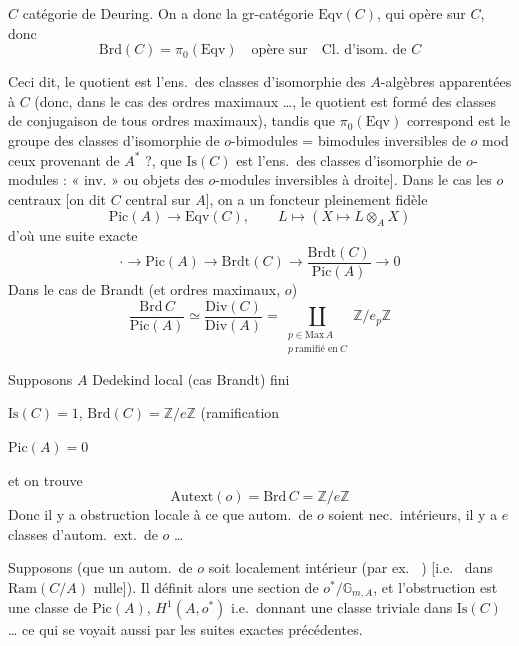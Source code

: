 \documentclass[11pt,a4paper]{article}
\begin{document}
$C$ catégorie de Deuring. On a donc la gr-catégorie $\mathrm{Eqv}(C)$, qui
opère sur $C$, donc
\[
  \mathrm{Brd}(C) = \pi_{0}(\mathrm{Eqv}) \quad \text{opère sur}
  \quad \text{Cl. d'isom. de } C
\]

Ceci dit, le quotient est l'ens.\ des classes d'isomorphie des
$A$-algèbres apparentées à $C$ (donc, dans le cas des  ordres
maximaux …, le quotient est formé des classes de conjugaison de tous
ordres maximaux), tandis que $\pi_{0}(\mathrm{Eqv})$ correspond
 est le groupe des classes d'isomorphie de $o$-bimodules
= bimodules inversibles de $o$ mod ceux provenant de  $A^{*}$ ?,
 que $\mathrm{Is}(C)$ est l'ens.\ des classes d'isomorphie
de $o$-modules :  « inv. » \struck{\ill{}} ou objets des
$o$-modules inversibles à droite]. Dans le cas les $o$ centraux
 [on dit $C$ central sur $A$], on a un foncteur pleinement
fidèle
\[
  \mathrm{Pic}(A) \longrightarrow \mathrm{Eqv}(C), \qquad
  L \longmapsto (X \mapsto L \otimes_{A} X)
\]
d'où une suite exacte
\[
  \cdot \to \mathrm{Pic}(A) \to \mathrm{Brdt}(C) \to
  \frac{\mathrm{Brdt}(C)}{\mathrm{Pic}(A)} \to 0
\]
Dans le cas de Brandt (et ordres maximaux, $o$)
\[
  \frac{\mathrm{Brd}\, C}{\mathrm{Pic}(A)} \simeq
  \frac{\mathrm{Div}(C)}{\mathrm{Div}(A)} =
  \coprod_{\substack{p \in \mathrm{Max}\, A \\ p\ \text{ramifié en}\ C}}
  \mathbb{Z}/e_{p}\mathbb{Z}
\]

Supposons $A$  Dedekind \struck{\ill{}} local (cas Brandt)
 \ill{} fini

$\mathrm{Is}(C) = 1$, $\mathrm{Brd}(C) = \mathbb{Z}/e\mathbb{Z}$
(ramification

$\mathrm{Pic}(A) = 0$

et on trouve
\[
  \mathrm{Autext}(o) = \mathrm{Brd}\, C = \mathbb{Z}/e\mathbb{Z}
\]
Donc il y a obstruction locale à ce que  autom.\ de $o$
soient nec.\ intérieurs, il y a $e$ classes d'autom.\ ext.\ de $o$ …

Supposons (que un autom.\ de $o$ soit localement 
intérieur (par ex.\ \ill{} \ill{}) [i.e.\ \ill{} dans
$\mathrm{Ram}(C/A)$ nulle]).  Il définit alors une
section de $o^{*}/\mathbb{G}_{m,A}$, et \struck{\ill{}} l'obstruction
\ill{} est une classe de $\mathrm{Pic}(A)$, \ill{} \struck{\ill{}}
$H^{1}(A, o^{*})$ i.e.\ donnant une classe triviale dans $\mathrm{Is}(C)$
… \struck{\ill{}} ce qui se voyait aussi par les suites exactes
précédentes.
\end{document}
